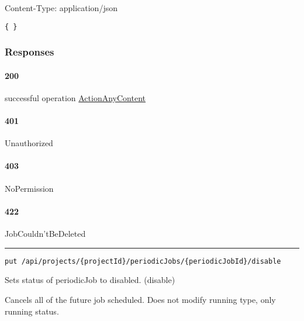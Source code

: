 Content-Type: application/json

\begin{verbatim}
{ }
\end{verbatim}

\hypertarget{responses-13}{%
\subsubsection*{Responses}\label{responses-13}}

\hypertarget{section-49}{%
\paragraph{200}\label{section-49}}

successful operation
\protect\hyperlink{ActionAnyContent}{ActionAnyContent}

\hypertarget{section-50}{%
\paragraph{401}\label{section-50}}

Unauthorized \protect\hyperlink{}{}

\hypertarget{section-51}{%
\paragraph{403}\label{section-51}}

NoPermission \protect\hyperlink{}{}

\hypertarget{section-52}{%
\paragraph{422}\label{section-52}}

JobCouldn'tBeDeleted \protect\hyperlink{}{}

\begin{center}\rule{0.5\linewidth}{0.5pt}\end{center}

\protect\hypertarget{disable}{}{}



\begin{verbatim}
put /api/projects/{projectId}/periodicJobs/{periodicJobId}/disable
\end{verbatim}

Sets status of periodicJob to disabled. ({disable})

Cancels all of the future job scheduled. Does not modify running type,
only running status.

